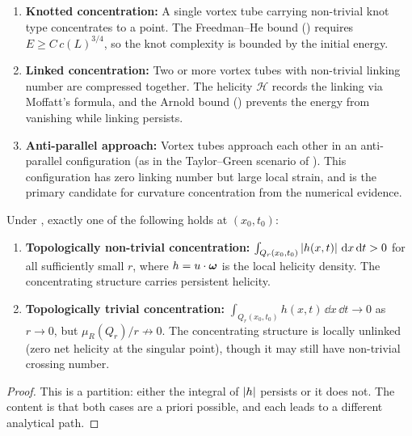 \begin{enumerate}[label=(\roman*)]
  \item \textbf{Knotted concentration:} A single vortex tube carrying non-trivial
    knot type concentrates to a point.  The Freedman--He bound
    () requires $E \geq C\,c(L)^{3/4}$, so the knot
    complexity is bounded by the initial energy.

  \item \textbf{Linked concentration:} Two or more vortex tubes with non-trivial
    linking number are compressed together.  The helicity $\mathcal{H}$ records the
    linking via Moffatt's formula, and the Arnold bound ()
    prevents the energy from vanishing while linking persists.

  \item \textbf{Anti-parallel approach:} Vortex tubes approach each other in an
    anti-parallel configuration (as in the Taylor--Green scenario of
    ).  This configuration has zero linking number but
    large local strain, and is the primary candidate for curvature concentration
    from the numerical evidence.
\end{enumerate}

\begin{proposition}\label{prop:dichotomy}
  Under , exactly one of the following holds at $(x_0, t_0)$:
  \begin{enumerate}[label=(D\arabic*)]
    \item \label{item:D1}
      \textbf{Topologically non-trivial concentration:}
      $\int_{Q_r(x_0,t_0)} \left\lvert h(x,t) \right\rvert\,\mathrm{d} x\,\mathrm{d} t > 0$ for all sufficiently
      small $r$, where $h = u\cdot\boldsymbol{\omega}$ is the local helicity density.
      The concentrating structure carries persistent helicity.

    \item \label{item:D2}
      \textbf{Topologically trivial concentration:}
      $\int_{Q_r(x_0,t_0)} h(x,t)\,\dd x\,\dd t \to 0$ as $r \to 0$, but
      $\mu_R(Q_r)/r \not\to 0$.  The concentrating structure is locally unlinked
      (zero net helicity at the singular point), though it may still have non-trivial
      crossing number.
  \end{enumerate}
\end{proposition}

\begin{proof}
  This is a partition: either the integral of $\left\lvert h \right\rvert$ persists or it does not.
  The content is that both cases are a priori possible, and each leads to a
  different analytical path.
\end{proof}

